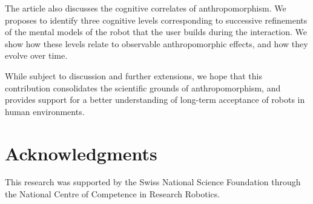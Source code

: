 \documentclass{frontiersSCNS} %
\begin{document}
The article also discusses the cognitive correlates of anthropomorphism. We
proposes to identify three cognitive levels corresponding to successive
refinements of the mental models of the robot that the user builds during the
interaction. We show how these levels relate to observable anthropomorphic
effects, and how they evolve over time.

While subject to discussion and further extensions, we hope that this
contribution consolidates the scientific grounds of anthropomorphism, and
provides support for a better understanding of long-term acceptance of robots in
human environments.


\section*{Acknowledgments}

This research was supported by the Swiss National Science Foundation through the National Centre of Competence in Research Robotics.


\end{document}
